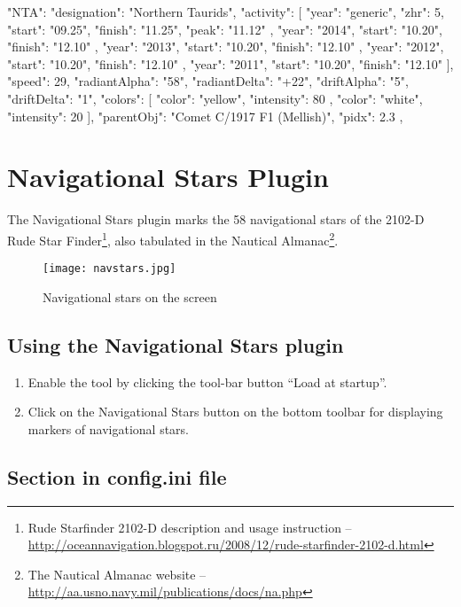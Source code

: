 \begin{configfile}
"NTA":
	{
		"designation": "Northern Taurids",
		"activity":
		[
		{
			"year": "generic",
			"zhr": 5,
			"start": "09.25",
			"finish": "11.25",
			"peak": "11.12"
		},
		{
			"year": "2014",
			"start": "10.20",
			"finish": "12.10"
		},
		{
			"year": "2013",
			"start": "10.20",
			"finish": "12.10"
		},
		{
			"year": "2012",
			"start": "10.20",
			"finish": "12.10"
		},
		{
			"year": "2011",
			"start": "10.20",
			"finish": "12.10"
		}
		],
		"speed": 29,
		"radiantAlpha": "58",
		"radiantDelta": "+22",
		"driftAlpha": "5",
		"driftDelta": "1",
		"colors":
		[
		{
			"color": "yellow",
			"intensity": 80
		},
		{
			"color": "white",
			"intensity": 20
		}
		],
		"parentObj": "Comet C/1917 F1 (Mellish)",
		"pidx": 2.3
	},
\end{configfile}


\newpage

\section{Navigational Stars Plugin}
\label{sec:plugins:NavigationalStars}
The Navigational Stars plugin marks the 58 navigational stars of the 2102-D Rude Star Finder\footnote{Rude Starfinder 2102-D description and usage instruction -- \url{http://oceannavigation.blogspot.ru/2008/12/rude-starfinder-2102-d.html}}, also tabulated in the Nautical Almanac\footnote{The Nautical Almanac website -- \url{http://aa.usno.navy.mil/publications/docs/na.php}}.

\begin{figure}[h]
\texttt{[image: navstars.jpg]}
\label{fig:NavigationalStars}
\caption{Navigational stars on the screen}
\end{figure}

\subsection{Using the Navigational Stars plugin}
\label{sec:plugins:NavigationalStars:using}

\begin{enumerate}
\item Enable the tool by clicking the tool-bar button ``Load at startup''.
\item Click on the Navigational Stars button on the bottom toolbar for displaying markers of navigational stars.
\end{enumerate}


\subsection{Section  in config.ini file}
\label{sec:plugins:NavigationalStars:config}

